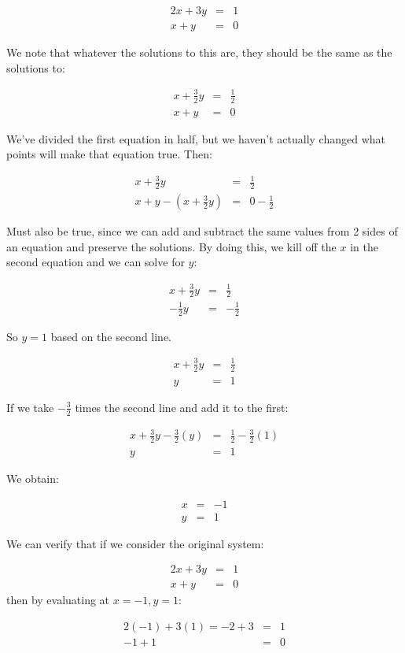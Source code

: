 \begin{example}
\begin{eqnarray*}
2x+3y&=&1\\
x+y&=&0
\end{eqnarray*}

We note that whatever the solutions to this are, they should be the same as the solutions to:

\begin{eqnarray*}
x+\frac{3}{2}y&=&\frac{1}{2}\\
x+y&=&0
\end{eqnarray*}

We've divided the first equation in half, but we haven't actually changed what points will make that equation true.  Then:

\begin{eqnarray*}
x+\frac{3}{2}y&=&\frac{1}{2}\\
x+y-(x+\frac{3}{2}y)&=&0-\frac{1}{2}
\end{eqnarray*}

Must also be true, since we can add and subtract the same values from 2 sides of an equation and preserve the solutions.  By doing this, we kill off the $x$ in the second equation and we can solve for $y$:

\begin{eqnarray*}
x+\frac{3}{2}y&=&\frac{1}{2}\\
-\frac{1}{2}y&=&-\frac{1}{2}
\end{eqnarray*}

So $y=1$ based on the second line.  

\begin{eqnarray*}
x+\frac{3}{2}y&=&\frac{1}{2}\\
y&=&1
\end{eqnarray*}


If we take $-\frac{3}{2}$ times the second line and add it to the first:

\begin{eqnarray*}
x+\frac{3}{2}y-\frac{3}{2}(y)&=&\frac{1}{2}-\frac{3}{2}(1)\\
y&=&1
\end{eqnarray*}

We obtain:

\begin{eqnarray*}
x&=&-1\\
y&=&1
\end{eqnarray*}

We can verify that if we consider the original system:


\begin{eqnarray*}
2x+3y&=&1\\
x+y&=&0
\end{eqnarray*}
 then by evaluating at $x=-1, y=1$:
 
\begin{eqnarray*}
2(-1)+3(1)=-2+3&=&1\\
-1+1&=&0
\end{eqnarray*}
 


\end{example}

